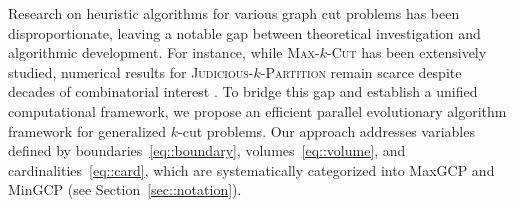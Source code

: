 \documentclass[12pt, a4paper]{article}%
\numberwithin{equation}{section}
\theoremstyle{plain}
\newcommand{\blue}{\textcolor{blue}}
\begin{document}
	
	
	
	Research on heuristic algorithms for various graph cut problems has been disproportionate, leaving a notable gap between theoretical investigation and algorithmic development. For instance, while \textsc{Max}-$k$-\textsc{Cut} has been extensively studied, numerical results for \textsc{Judicious}-$k$-\textsc{Partition} remain scarce despite decades of combinatorial interest \cite{bollobas2002problems, bollobas2004judicious, lee2016judicious, hou2021bisections}. To bridge this gap and establish a unified computational framework, we propose an efficient parallel evolutionary algorithm framework for generalized $k$-cut problems. Our approach addresses variables defined by boundaries~\eqref{eq::boundary}, volumes~\eqref{eq::volume}, and cardinalities~\eqref{eq::card}, which are systematically categorized into MaxGCP and MinGCP (see Section~\ref{sec::notation}).
	
\end{document}
